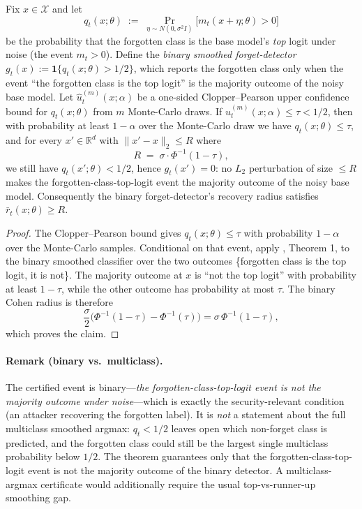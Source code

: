 \begin{theorem}
\label{thm:smooth}
Fix $x \in \mathcal{X}$ and let
\[
  q_t(x;\theta) \;:=\; \Pr_{\eta \sim N(0,\sigma^2 I)}\!
  \bigl[m_t(x+\eta;\theta) > 0\bigr]
\]
be the probability that the forgotten class is the base model's \emph{top}
logit under noise (the event $m_t > 0$). Define the \emph{binary smoothed
forget-detector} $g_t(x) := \mathbf{1}\{q_t(x;\theta) > 1/2\}$, which reports
the forgotten class only when the event ``the forgotten class is the top logit''
is the majority outcome of the noisy base model. Let
$\widehat u_t^{(m)}(x;\alpha)$ be a one-sided Clopper--Pearson upper confidence
bound for $q_t(x;\theta)$ from $m$ Monte-Carlo draws. If
$\widehat u_t^{(m)}(x;\alpha) \leq \tau < 1/2$, then with probability at least
$1-\alpha$ over the Monte-Carlo draw we have $q_t(x;\theta)\leq\tau$, and for
every $x' \in \mathbb{R}^d$ with $\|x' - x\|_2 \leq R$ where
\begin{equation}
  R \;=\; \sigma \cdot \Phi^{-1}(1 - \tau),
\end{equation}
we still have $q_t(x';\theta) < 1/2$, hence $g_t(x') = 0$: no $L_2$
perturbation of size $\leq R$ makes the forgotten-class-top-logit event the
majority outcome of the noisy base model. Consequently the binary
forget-detector's recovery radius
satisfies $\bar r_t(x;\theta) \geq R$.
\end{theorem}

\begin{proof}
The Clopper--Pearson bound gives $q_t(x;\theta)\leq\tau$ with probability
$1-\alpha$ over the Monte-Carlo samples. Conditional on that event, apply
\cite{cohen2019certified}, Theorem 1, to the binary smoothed classifier over
the two outcomes \{forgotten class is the top logit, it is not\}. The majority
outcome at $x$ is ``not the top logit'' with probability at least $1-\tau$,
while the other outcome has probability at most $\tau$. The binary Cohen radius
is therefore
\[
\frac{\sigma}{2}\bigl(\Phi^{-1}(1-\tau)-\Phi^{-1}(\tau)\bigr)
=\sigma\,\Phi^{-1}(1-\tau),
\]
which proves the claim.
\end{proof}

\paragraph{Remark (binary vs.\ multiclass).} The certified event is
binary---\emph{the forgotten-class-top-logit event is not the majority outcome
under noise}---which is exactly the security-relevant condition (an attacker
recovering the forgotten label). It is \emph{not} a statement about the full multiclass
smoothed argmax: $q_t < 1/2$ leaves open which non-forget class is
predicted, and the forgotten class could still be the largest single
multiclass probability below $1/2$. The theorem guarantees only that the
forgotten-class-top-logit event is not the majority outcome of the binary
detector. A
multiclass-argmax certificate would additionally require the usual
top-vs-runner-up smoothing gap.

